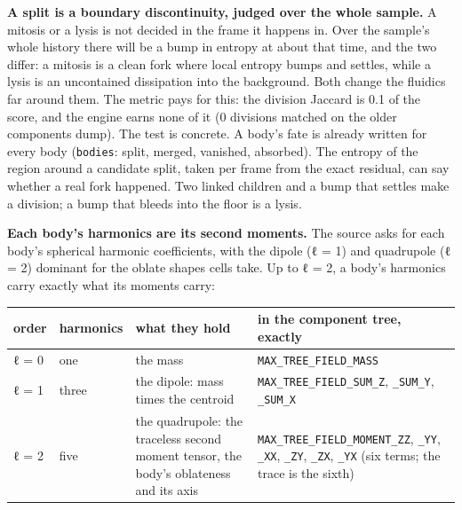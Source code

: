 \textbf{A split is a boundary discontinuity, judged over the whole sample.} A mitosis or a lysis is not decided in the frame it happens in. Over the sample's whole history there will be a bump in entropy at about that time, and the two differ: a mitosis is a clean fork where local entropy bumps and settles, while a lysis is an uncontained dissipation into the background. Both change the fluidics far around them. The metric pays for this: the division Jaccard is 0.1 of the score, and the engine earns none of it (0 divisions matched on the older components dump). The test is concrete. A body's fate is already written for every body (\texttt{bodies}: split, merged, vanished, absorbed). The entropy of the region around a candidate split, taken per frame from the exact residual, can say whether a real fork happened. Two linked children and a bump that settles make a division; a bump that bleeds into the floor is a lysis.

\textbf{Each body's harmonics are its second moments.} The source asks for each body's spherical harmonic coefficients, with the dipole (ℓ = 1) and quadrupole (ℓ = 2) dominant for the oblate shapes cells take. Up to ℓ = 2, a body's harmonics carry exactly what its moments carry:

{\footnotesize
\setlength{\tabcolsep}{6pt}
\begin{longtable}{>{\RaggedRight\arraybackslash}p{}>{\RaggedRight\arraybackslash}p{}>{\RaggedRight\arraybackslash}p{}>{\RaggedRight\arraybackslash}p{}}
\toprule
order & harmonics & what they hold & in the component tree, exactly \\
\midrule
\endhead
ℓ = 0 & one & the mass & \texttt{MAX\_\allowbreak{}TREE\_\allowbreak{}FIELD\_\allowbreak{}MASS} \\
ℓ = 1 & three & the dipole: mass times the centroid & \texttt{MAX\_\allowbreak{}TREE\_\allowbreak{}FIELD\_\allowbreak{}SUM\_\allowbreak{}Z}, \texttt{\_\allowbreak{}SUM\_\allowbreak{}Y}, \texttt{\_\allowbreak{}SUM\_\allowbreak{}X} \\
ℓ = 2 & five & the quadrupole: the traceless second moment tensor, the body's oblateness and its axis & \texttt{MAX\_\allowbreak{}TREE\_\allowbreak{}FIELD\_\allowbreak{}MOMENT\_\allowbreak{}ZZ}, \texttt{\_\allowbreak{}YY}, \texttt{\_\allowbreak{}XX}, \texttt{\_\allowbreak{}ZY}, \texttt{\_\allowbreak{}ZX}, \texttt{\_\allowbreak{}YX} (six terms; the trace is the sixth) \\
\bottomrule
\end{longtable}
}

